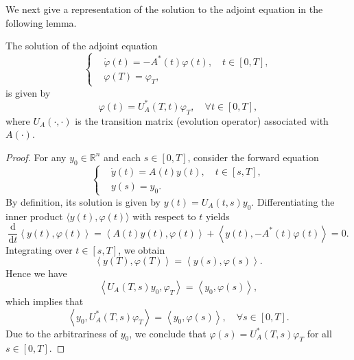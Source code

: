 \documentclass{IEEEtran}
\begin{document}
	We next give a representation of the solution to the adjoint equation in the following lemma.
	\begin{lemma}\label{varphi}
		The solution of the adjoint equation
		\begin{equation}\label{varphieq}
			\left\{
			\begin{aligned}
				&\dot{\varphi}(t)=-A^*(t) \varphi(t),\quad t\in [0, T],\\
				&\varphi(T)=\varphi_T ,
			\end{aligned}
			\right.
		\end{equation}
		is given by
		\begin{equation*}
			\varphi(t)=U^*_A(T,t)\varphi_T, \quad \forall t \in[0,T],
		\end{equation*}
		where $U_A(\cdot,\cdot)$ is the transition matrix (evolution operator) associated with $A(\cdot)$.
	\end{lemma}
	\begin{proof}
		For any $y_0 \in \mathbb R^n$ and each $s \in [0,T]$, consider the forward equation 
		\begin{equation*}
			\left\{
			\begin{aligned}
				&\dot{y}(t)=A(t) y(t),\quad t\in [s, T],\\
				&y(s)=y_0.
			\end{aligned}
			\right.
		\end{equation*}
		By definition, its solution is given by $y(t)=U_A(t,s)y_0$.
		Differentiating the inner product $\langle y(t), \varphi(t)\rangle$ with respect to $t$ yields
		\begin{equation*}
			\frac{\mathrm{d}}{\mathrm{d}t}\left\langle y(t), \varphi(t)\right\rangle = \left\langle A(t)y(t), \varphi(t)\right\rangle + \left\langle y(t), -A^*(t)\varphi(t)\right\rangle = 0.
		\end{equation*}
		Integrating over $t \in [s,T]$, we obtain
		\begin{equation*}
			\left\langle y(T), \varphi(T)\right\rangle=\left\langle y(s), \varphi(s)\right\rangle.
		\end{equation*}
		Hence we have 
		\begin{equation*}
			\left\langle U_A(T,s)y_0, \varphi_T\right\rangle=\left\langle y_0, \varphi(s)\right\rangle,
		\end{equation*}
		which implies that
		\begin{equation*}
			\left\langle y_0, U^*_A(T,s)\varphi_T\right\rangle=\left\langle y_0, \varphi(s)\right\rangle,\quad \forall s \in [0,T].
		\end{equation*}
		Due to the arbitrariness of $y_0$, we conclude that $\varphi(s)=U^*_A(T,s)\varphi_T$ for all $s \in[0,T]$.
	\end{proof}
	
\end{document}
